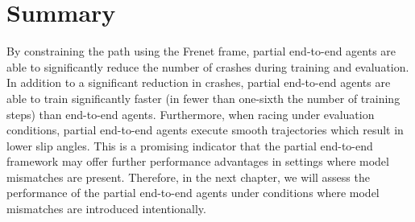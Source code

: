\section{Summary}


By constraining the path using the Frenet frame, partial end-to-end agents are able to significantly reduce the number of crashes during training and evaluation.
In addition to a significant reduction in crashes, partial end-to-end agents are able to train significantly faster (in fewer than one-sixth the number of training steps) than end-to-end agents.
Furthermore, when racing under evaluation conditions, partial end-to-end agents execute smooth trajectories which result in lower slip angles.
This is a promising indicator that the partial end-to-end framework may offer further performance advantages in settings where model mismatches are present.
Therefore, in the next chapter, we will assess the performance of the partial end-to-end agents under conditions where model mismatches are introduced intentionally. 


